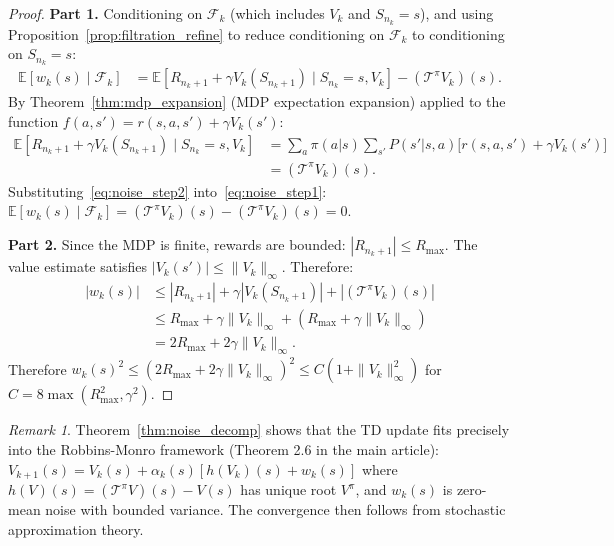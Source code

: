 \documentclass[11pt,a4paper]{article}
\theoremstyle{definition}
\theoremstyle{plain}
\theoremstyle{remark}
\newtheorem{remark}{Remark}[section]
\newcommand{\E}{\mathbb{E}}
\begin{document}
\begin{proof}
\textbf{Part 1.} Conditioning on $\mathcal{F}_k$ (which includes $V_k$ and $S_{n_k} = s$), and using Proposition~\ref{prop:filtration_refine} to reduce conditioning on $\mathcal{F}_k$ to conditioning on $S_{n_k} = s$:
\begin{align}
    \E[w_k(s) \mid \mathcal{F}_k]
    &= \E[R_{n_k+1} + \gamma V_k(S_{n_k+1}) \mid S_{n_k} = s, V_k] - (\mathcal{T}^\pi V_k)(s). \label{eq:noise_step1}
\end{align}
By Theorem~\ref{thm:mdp_expansion} (MDP expectation expansion) applied to the function $f(a, s') = r(s,a,s') + \gamma V_k(s')$:
\begin{align}
    \E[R_{n_k+1} + \gamma V_k(S_{n_k+1}) \mid S_{n_k} = s, V_k]
    &= \sum_a \pi(a|s) \sum_{s'} P(s'|s,a)\bigl[r(s,a,s') + \gamma V_k(s')\bigr] \nonumber\\
    &= (\mathcal{T}^\pi V_k)(s). \label{eq:noise_step2}
\end{align}
Substituting~\eqref{eq:noise_step2} into~\eqref{eq:noise_step1}: $\E[w_k(s) \mid \mathcal{F}_k] = (\mathcal{T}^\pi V_k)(s) - (\mathcal{T}^\pi V_k)(s) = 0$.

\textbf{Part 2.} Since the MDP is finite, rewards are bounded: $|R_{n_k+1}| \leq R_{\max}$. The value estimate satisfies $|V_k(s')| \leq \|V_k\|_\infty$. Therefore:
\begin{align}
    |w_k(s)| &\leq |R_{n_k+1}| + \gamma |V_k(S_{n_k+1})| + |(\mathcal{T}^\pi V_k)(s)| \nonumber\\
    &\leq R_{\max} + \gamma \|V_k\|_\infty + (R_{\max} + \gamma \|V_k\|_\infty) \nonumber\\
    &= 2R_{\max} + 2\gamma \|V_k\|_\infty. \label{eq:noise_bound_step}
\end{align}
Therefore $w_k(s)^2 \leq (2R_{\max} + 2\gamma \|V_k\|_\infty)^2 \leq C(1 + \|V_k\|_\infty^2)$ for $C = 8\max(R_{\max}^2, \gamma^2)$.
\end{proof}

\begin{remark}
Theorem~\ref{thm:noise_decomp} shows that the TD update fits precisely into the Robbins-Monro framework (Theorem 2.6 in the main article): $V_{k+1}(s) = V_k(s) + \alpha_k(s)[h(V_k)(s) + w_k(s)]$ where $h(V)(s) = (\mathcal{T}^\pi V)(s) - V(s)$ has unique root $V^\pi$, and $w_k(s)$ is zero-mean noise with bounded variance. The convergence then follows from stochastic approximation theory.
\end{remark}

\end{document}
